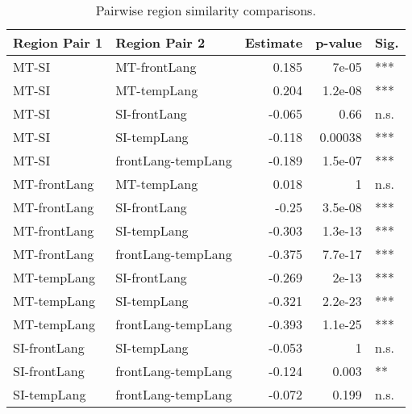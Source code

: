 \begin{table}[h]
\centering
\begin{tabular}{llrrl}
\toprule
 Region Pair 1   & Region Pair 2      &   Estimate &   p-value & Sig.   \\
\midrule
 MT-SI           & MT-frontLang       &      0.185 &   7e-05   & ***    \\
 MT-SI           & MT-tempLang        &      0.204 &   1.2e-08 & ***    \\
 MT-SI           & SI-frontLang       &     -0.065 &   0.66    & n.s.   \\
 MT-SI           & SI-tempLang        &     -0.118 &   0.00038 & ***    \\
 MT-SI           & frontLang-tempLang &     -0.189 &   1.5e-07 & ***    \\
 MT-frontLang    & MT-tempLang        &      0.018 &   1       & n.s.   \\
 MT-frontLang    & SI-frontLang       &     -0.25  &   3.5e-08 & ***    \\
 MT-frontLang    & SI-tempLang        &     -0.303 &   1.3e-13 & ***    \\
 MT-frontLang    & frontLang-tempLang &     -0.375 &   7.7e-17 & ***    \\
 MT-tempLang     & SI-frontLang       &     -0.269 &   2e-13   & ***    \\
 MT-tempLang     & SI-tempLang        &     -0.321 &   2.2e-23 & ***    \\
 MT-tempLang     & frontLang-tempLang &     -0.393 &   1.1e-25 & ***    \\
 SI-frontLang    & SI-tempLang        &     -0.053 &   1       & n.s.   \\
 SI-frontLang    & frontLang-tempLang &     -0.124 &   0.003   & **     \\
 SI-tempLang     & frontLang-tempLang &     -0.072 &   0.199   & n.s.   \\
\bottomrule
\end{tabular}
\caption{Pairwise region similarity comparisons.}
\end{table}
